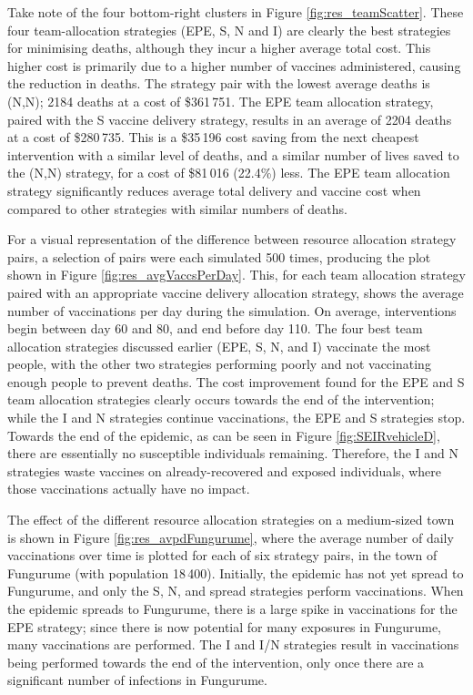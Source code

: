 Take note of the four bottom-right clusters in Figure \ref{fig:res_teamScatter}. These four team-allocation strategies (EPE, S, N and I) are clearly the best strategies for minimising deaths, although they incur a higher average total cost. This higher cost is primarily due to a higher number of vaccines administered, causing the reduction in deaths. The strategy pair with the lowest average deaths is (N,N); 2184 deaths at a cost of \$361\,751. The EPE team allocation strategy, paired with the S vaccine delivery strategy, results in an average of 2204 deaths at a cost of \$280\,735. This is a \$35\,196 cost saving from the next cheapest intervention with a similar level of deaths, and a similar number of lives saved to the (N,N) strategy, for a cost of \$81\,016 (22.4\%) less. The EPE team allocation strategy significantly reduces average total delivery and vaccine cost when compared to other strategies with similar numbers of deaths.

For a visual representation of the difference between resource allocation strategy pairs, a selection of pairs were each simulated 500 times, producing the plot shown in Figure \ref{fig:res_avgVaccsPerDay}. This, for each team allocation strategy paired with an appropriate vaccine delivery allocation strategy, shows the average number of vaccinations per day during the simulation. On average, interventions begin between day 60 and 80, and end before day 110. The four best team allocation strategies discussed earlier (EPE, S, N, and I) vaccinate the most people, with the other two strategies performing poorly and not vaccinating enough people to prevent deaths. The cost improvement found for the EPE and S team allocation strategies clearly occurs towards the end of the intervention; while the I and N strategies continue vaccinations, the EPE and S strategies stop. Towards the end of the epidemic, as can be seen in Figure \ref{fig:SEIRvehicleD}, there are essentially no susceptible individuals remaining. Therefore, the I and N strategies waste vaccines on already-recovered and exposed individuals, where those vaccinations actually have no impact. 

The effect of the different resource allocation strategies on a medium-sized town is shown in Figure \ref{fig:res_avpdFungurume}, where the average number of daily vaccinations over time is plotted for each of six strategy pairs, in the town of Fungurume (with population 18\,400). Initially, the epidemic has not yet spread to Fungurume, and only the S, N, and spread strategies perform vaccinations. When the epidemic spreads to Fungurume, there is a large spike in vaccinations for the EPE strategy; since there is now potential for many exposures in Fungurume, many vaccinations are performed. The I and I/N strategies result in vaccinations being performed towards the end of the intervention, only once there are a significant number of infections in Fungurume. 

